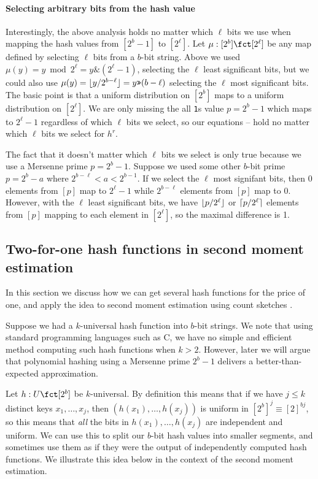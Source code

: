 \paragraph{Selecting arbitrary bits from the hash value}
Interestingly, the above analysis holds no matter which $\ell$ bits we
use when mapping the hash values from $[2^b-1]$ to $[2^\ell]$.  Let
$\mu:[2^b]\fct[2^\ell]$ be any map defined by selecting $\ell$ bits
from a $b$-bit string. Above we used
$\mu(y)=y\bmod 2^\ell=y\texttt\& (2^\ell-1)$,
selecting the $\ell$ least significant bits, but we could
also use $\mu(y)=\lfloor {y/2^{b-\ell}} \rfloor=y\texttt{>>}(b-\ell)$ selecting
the $\ell$ most significant bits. The basic point is that a uniform
distribution on $[2^b]$ maps to a uniform distribution on
$[2^\ell]$. We are only missing the all \texttt1s value $p=2^b-1$ which maps to $2^\ell-1$
regardless of which $\ell$ bits we select, so our equations
-- hold no matter which $\ell$
bits we select for $h^r$.

The fact that it doesn't matter which $\ell$ bits we select is only
true because we use a Mersenne prime $p=2^b-1$. Suppose we used some
other $b$-bit prime $p=2^b-a$ where $2^{b-\ell}<a<2^{b-1}$. If we
select the $\ell$ most signifant bits, then $0$ elements from $[p]$
map to $2^\ell-1$ while $2^{b-\ell}$ elements from $[p]$ map to $0$. However,
with the $\ell$ least significant bits, we have $\lfloor {p/2^\ell} \rfloor$ or
$\lceil {p/2^\ell}\rceil$ elements from $[p]$ mapping to each element in
$[2^\ell]$, so the maximal difference is 1.


\subsection{Two-for-one hash functions in second moment estimation}
In this section we discuss how we can get several hash functions for
the price of one, and apply the idea to second moment estimation using
count sketches \cite{charikar04count-sketch}.

Suppose we had a $k$-universal hash function into $b$-bit strings.
We note that using standard programming languages such as C, we have
no simple and efficient method computing such hash
functions when $k>2$. However, later we will argue that polynomial
hashing using a Mersenne prime $2^b-1$ delivers a better-than-expected
approximation.

Let $h:U\fct [2^b]$ be $k$-universal. By definition this
means that if we have $j\leq k$ distinct keys $x_1,\ldots,x_j$, then
$(h(x_1),\ldots,h(x_j))$ is uniform in $[2^b]^j\equiv [2]^{bj}$,
so this means that \emph{all} the bits in $h(x_1),\ldots,h(x_j)$ are
independent and uniform. We can use this to split our $b$-bit hash
values into smaller segments, and sometimes use them as if
they were the output of independently computed hash functions.
We illustrate this idea below in the context of the second moment estimation.

